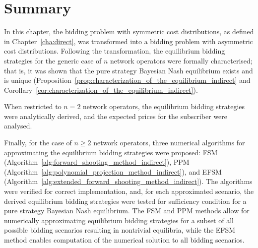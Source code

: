 \section{Summary}
\label{sec:summary_indirect}
In this chapter, the bidding problem with symmetric cost distributions, as defined in Chapter~\ref{cha:direct}, was transformed into a bidding problem with asymmetric cost distributions. Following the transformation, the equilibrium bidding strategies for the generic case of $n$ network operators were formally characterised; that is, it was shown that the pure strategy Bayesian Nash equilibrium exists and is unique (Proposition~\ref{prop:characterization_of_the_equilibrium_indirect} and Corollary~\ref{cor:characterization_of_the_equilibrium_indirect}).

When restricted to $n=2$ network operators, the equilibrium bidding strategies were analytically derived, and the expected prices for the subscriber were analysed.

Finally, for the case of $n\geq 2$ network operators, three numerical algorithms for approximating the equilibrium bidding strategies were proposed: FSM (Algorithm~\ref{alg:forward_shooting_method_indirect}), PPM (Algorithm~\ref{alg:polynomial_projection_method_indirect}), and EFSM (Algorithm~\ref{alg:extended_forward_shooting_method_indirect}). The algorithms were verified for correct implementation, and, for each approximated scenario, the derived equilibrium bidding strategies were tested for sufficiency condition for a pure strategy Bayesian Nash equilibrium. The FSM and PPM methods allow for numerically approximating equilibrium bidding strategies for a subset of all possible bidding scenarios resulting in nontrivial equilibria, while the EFSM method enables computation of the numerical solution to all bidding scenarios.
